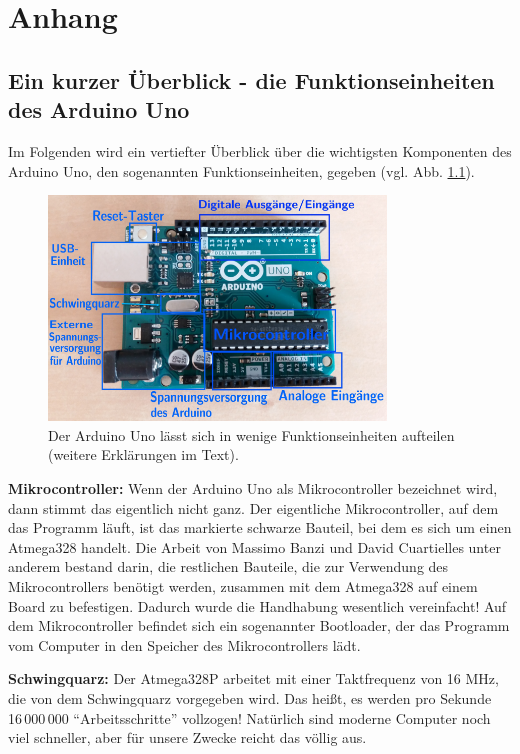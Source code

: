 \chapter{Anhang}

\section{Ein kurzer Überblick - die Funktionseinheiten des Arduino Uno}
\label{sec:ueberblick}
Im Folgenden wird ein vertiefter Überblick über die wichtigsten Komponenten des Arduino Uno, den sogenannten Funktionseinheiten, gegeben (vgl. Abb. \ref{abb:uno_r3}).

\begin{figure}[h]
	\centering
	\includegraphics[width=0.8\textwidth]{pics/arduino-beschriftet.png}
	\caption{Der Arduino Uno lässt sich in wenige Funktionseinheiten aufteilen (weitere Erklärungen im Text).}
	\label{abb:uno_r3}
\end{figure}

\textbf{Mikrocontroller:} Wenn der Arduino Uno als Mikrocontroller bezeichnet wird, dann stimmt das eigentlich nicht ganz. Der eigentliche Mikrocontroller, auf dem das Programm läuft, ist das markierte schwarze Bauteil, bei dem es sich um einen Atmega328 handelt. Die Arbeit von Massimo Banzi und David Cuartielles unter anderem bestand darin, die restlichen Bauteile, die zur Verwendung des Mikrocontrollers benötigt werden, zusammen mit dem Atmega328 auf einem Board zu befestigen. Dadurch wurde die Handhabung wesentlich vereinfacht! Auf dem Mikrocontroller befindet sich ein sogenannter Bootloader, der das Programm vom Computer in den Speicher des Mikrocontrollers lädt.

\textbf{Schwingquarz:} Der Atmega328P arbeitet mit einer Taktfrequenz von 16 MHz, die von dem Schwingquarz vorgegeben wird. Das heißt, es werden pro Sekunde 16\,000\,000 \enquote{Arbeitsschritte} vollzogen! Natürlich sind moderne Computer noch viel schneller, aber für unsere Zwecke reicht das völlig aus.

